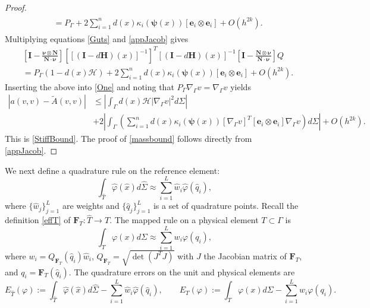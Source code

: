 \documentclass{siamart0516}
\newcommand{\bF}{\ensuremath{\boldsymbol F}}
\numberwithin{equation}{section}
\numberwithin{theorem}{section}
\numberwithin{figure}{section}
\begin{document}
\begin{proof}
\begin{align}
\begin{aligned}
&=P_\Gamma
+ 2\sum_{i=1}^nd(x)\kappa_i(\mathbf{\psi}(x))\left[ \mathbf{e}_i\otimes\mathbf{e}_i\right] 
+ O(h^{2k}).
\end{aligned}
\label{Guts}
\end{align}
Multiplying equations \eqref{Guts} and \eqref{appJacob} gives
\begin{align*}
	&\left[ \mathbf{I} - \frac{\mathbf{\nu}\otimes\mathbf{N}}{\mathbf{N}\cdot\mathbf{\nu}}\right][[(\mathbf{I} - d\mathbf{H})(x)]^{-1}]^T[(\mathbf{I} - d\mathbf{H})(x)]^{-1}\left[ \mathbf{I} - \frac{\mathbf{N}\otimes\mathbf{\nu}}{\mathbf{N}\cdot\mathbf{\nu}} \right]
	Q\\
	&=P_\Gamma(1-d(x)\mathcal{H})
	+2\sum_{i=1}^nd(x)\kappa_i(\mathbf{\psi}(x))\left[ \mathbf{e}_i\otimes\mathbf{e}_i 
	\right] + O(h^{2k}).
\end{align*}
Inserting the above into \eqref{One} and noting that $P_\Gamma\nabla_\Gamma v = \nabla_\Gamma v$ yields 
\begin{align*}
	|a(v,v)-\widetilde{A}(v,v)|
	&\leq \left|\int_{\Gamma}d(x)\mathcal{H}\left|\nabla_{\Gamma}v\right|^2d\Sigma\right|\\
	&+2\left|\int_{\Gamma}\left(\sum_{i=1}^nd(x)\kappa_i(\mathbf{\psi}(x))\left[\nabla_{\Gamma}v\right]^T\left[ \mathbf{e}_i\otimes\mathbf{e}_i 
	\right]\nabla_\Gamma v\right) d\Sigma\right| + O(h^{2k}).
\end{align*}
This is \eqref{StiffBound}.	The proof of \eqref{massbound} follows directly from \eqref{appJacob}.
\end{proof}	

We next define a quadrature rule on the reference element:
$$
\int_{\hat{T}}\hat{\varphi}(\hat{x})d\hat{\Sigma}\approx \sum_{i=1}^L \hat{w}_i\hat{\varphi}(\hat{q}_i),
$$
where $\{\hat{w}_j\}_{j=1}^L$ are weights and $\{\hat{q}_j\}_{j=1}^L$ is a set of quadrature points. Recall the definition \eqref{effT} of $\bF_T:\hat{T} \rightarrow T$.  %
The mapped rule on a physical element $T \subset \Gamma$ is
$$
\int_{T}\varphi(x)d\Sigma\approx \sum_{i=1}^L w_i\varphi(q_i),
$$
where $w_i = Q_{\bF_T}(\hat{q}_i)\hat{w}_i$,  $Q_{\bF_T} = \sqrt{\det(J^TJ)}$ with $J$ the Jacobian matrix of $\bF_T$, and $q_i = \bF_T(\hat{q}_i)$.  The quadrature errors on the unit and physical elements are
\begin{equation}
E_{\hat{T}}(\varphi) := \int_{\hat{T}}\hat{\varphi}(\hat{x})d\hat{\Sigma} - \sum_{i=1}^L \hat{w}_i\hat{\varphi}(\hat{q}_i), \qquad
E_T(\varphi) := \int_{T}\varphi(x)d\Sigma - \sum_{i=1}^L w_i\varphi(q_i).
\label{QuadRule}
\end{equation}
\end{document}
